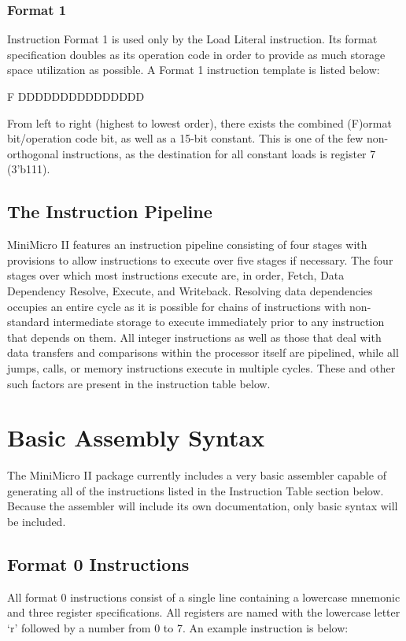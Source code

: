 \documentclass[12pt,letterpaper]{article}
\begin{document}
\subsubsection{Format 1}
Instruction Format 1 is used only by the Load Literal instruction. Its format specification doubles as its operation code in order to provide as much storage space utilization as possible. A Format 1 instruction template is listed below:\\

\begin{center}
F DDDDDDDDDDDDDDD
\end{center}

From left to right (highest to lowest order), there exists the combined (F)ormat bit/operation code bit, as well as a 15-bit constant. This is one of the few non-orthogonal instructions, as the destination for all constant loads is register 7 (3'b111). 

\subsection{The Instruction Pipeline}
MiniMicro II features an instruction pipeline consisting of four stages with provisions to allow instructions to execute over five stages if necessary. The four stages over which most instructions execute are, in order, Fetch, Data Dependency Resolve, Execute, and Writeback. Resolving data dependencies occupies an entire cycle as it is possible for chains of instructions with non-standard intermediate storage to execute immediately prior to any instruction that depends on them. All integer instructions as well as those that deal with data transfers and comparisons within the processor itself are pipelined, while all jumps, calls, or memory instructions execute in multiple cycles. These and other such factors are present in the instruction table below. 

\section{Basic Assembly Syntax}
The MiniMicro II package currently includes a very basic assembler capable of generating all of the instructions listed in the Instruction Table section below. Because the assembler will include its own documentation, only basic syntax will be included.

\subsection{Format 0 Instructions}
All format 0 instructions consist of a single line containing a lowercase mnemonic and three register specifications. All registers are named with the lowercase letter `r' followed by a number from 0 to 7. An example instruction is below:
\end{document}
